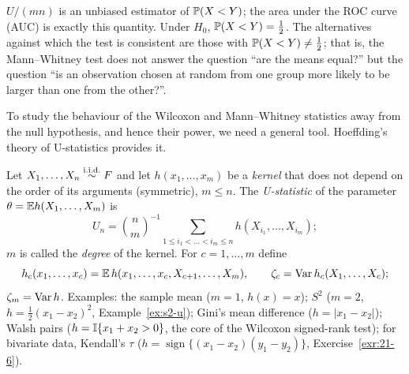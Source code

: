 \documentclass[main.tex]{subfiles}
\begin{document}
\begin{remark}
$U/(mn)$ is an unbiased estimator of $\P(X<Y)$; the area under the ROC curve (AUC) is exactly this quantity. Under $H_0$, $\P(X<Y)=\frac12$. The alternatives against which the test is consistent are those with $\P(X<Y)\ne\frac12$; that is, the Mann--Whitney test does not answer the question ``are the means equal?'' but the question ``is an observation chosen at random from one group more likely to be larger than one from the other?''.
\end{remark}

To study the behaviour of the Wilcoxon and Mann--Whitney statistics away from the null hypothesis, and hence their power, we need a general tool. Hoeffding's theory of U-statistics provides it.

\begin{definition}\label{def:u-istatistik}
Let $X_1,\dots,X_n\iid F$ and let $h(x_1,\dots,x_m)$ be a \emph{kernel} that does not depend on the order of its arguments (symmetric), $m\le n$. The \emph{U-statistic} of the parameter $\theta=\E h(X_1,\dots,X_m)$ is
\[
U_n=\binom nm^{-1}\sum_{1\le i_1<\dots<i_m\le n}h(X_{i_1},\dots,X_{i_m});
\]
$m$ is called the \emph{degree} of the kernel. For $c=1,\dots,m$ define
\[
h_c(x_1,\dots,x_c)=\E\,h(x_1,\dots,x_c,X_{c+1},\dots,X_m),\qquad\zeta_c=\Var h_c(X_1,\dots,X_c);
\]
$\zeta_m=\Var h$. Examples: the sample mean ($m=1$, $h(x)=x$); $S^2$ ($m=2$, $h=\frac12(x_1-x_2)^2$, Example~\ref{ex:s2-u}); Gini's mean difference ($h=|x_1-x_2|$); Walsh pairs ($h=\I\{x_1+x_2>0\}$, the core of the Wilcoxon signed-rank test); for bivariate data, Kendall's $\tau$ ($h=\operatorname{sign}\{(x_1-x_2)(y_1-y_2)\}$, Exercise~\ref{exr:21-6}).
\end{definition}
\end{document}
